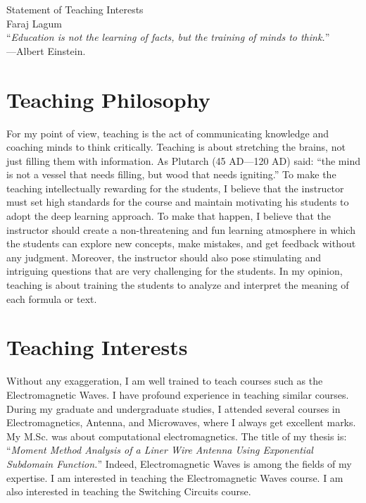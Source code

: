 \documentclass[11pt]{article}
\begin{document}
\begin{center}
{\Large Statement of Teaching Interests} \\[.3in]
{\large Faraj Lagum}\\
\vspace*{.5in}
{``\emph{Education is not the learning of facts, but the training of minds to think.}'' \\ ---Albert Einstein.}
\end{center}


\section{Teaching Philosophy}
For my point of view, teaching is the act of communicating knowledge and coaching minds to think critically. Teaching is about stretching the brains, not just filling them with information. As Plutarch (45 AD---120 AD) said: ``the mind is not a vessel that needs filling, but wood that needs igniting.'' To make the teaching intellectually rewarding for the students, I believe that the instructor must set high standards for the course and maintain motivating his students to adopt the deep learning approach. To make that happen, I believe that the instructor should create a non-threatening and fun learning atmosphere in which the students can explore new concepts, make mistakes, and get feedback without any judgment. Moreover, the instructor should also pose stimulating and intriguing questions that are very challenging for the students. In my opinion, teaching is about training the students to analyze and interpret the meaning of each formula or text. 

\section{Teaching Interests}

Without any exaggeration, I am well trained to teach courses such as the Electromagnetic Waves. I have profound experience in teaching similar courses. During my graduate and undergraduate studies, I attended several courses in Electromagnetics, Antenna, and Microwaves, where I always get excellent marks. My M.Sc. was about computational electromagnetics. The title of my thesis is: ``\emph{Moment Method Analysis of a Liner Wire Antenna Using Exponential Subdomain Function.}'' Indeed, Electromagnetic Waves is among the fields of my expertise. I am interested in teaching the Electromagnetic Waves course. I am also interested in teaching the Switching Circuits course.
\end{document}
